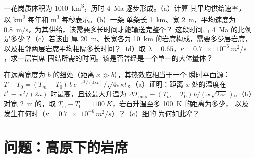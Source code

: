 \begin{exercise}[$\star\star\star$]\label{exo:b2:magma-emplacement:11}
一花岗质体积为 \qty{1000}{km^3}，历时 \qty{4}{Ma} 逐步形成。（a）计算
其平均供给速率，以 \unit{km^3} 每年和 \unit{m^3} 每秒表示。（b）一条
单条长 \qty{1}{km}、宽 \qty{2}{m}，平均速度为
\qty{0.8}{m/s}，为其供给。该需要多长时间才能输送完整个？
这段时间占 \qty{4}{Ma} 的比例是多少？（c）若该由
厚 \qty{20}{m}、长宽各为 \qty{10}{km} 的岩席构成，需要多少层岩席，
以及相邻两层岩席平均相隔多长时间？（d）取
$\lambda = 0.65$，$\kappa = \qty{0.7e-6}{m^2/s}$，求一层岩席
固结所需的时间。该是否曾经是一个单一的大体量体？
\end{exercise}

\begin{exercise}[$\star\star\star$]\label{exo:b2:magma-emplacement:12}
在远离宽度为 $b$ 的细处（距离 $x \gg b$），其热效应相当于一个
瞬时平面源：$T - T_0 = (T_m - T_0)\,b\,e^{-x^2/(4\kappa
t)}/\sqrt{4\pi\kappa t}$。（a）证明：距离 $x$ 处的温度在
$t^* = x^2/(2\kappa)$ 时最高，且该最大升温为 $\Delta T_{\max} = (T_m -
T_0)\,b/(x\sqrt{2\pi e})$。（b）对宽 \qty{2}{m} 的，取 $T_m - T_0 =
\qty{1100}{K}$，岩石升温至多 \qty{100}{K} 的距离为多少，
以及发生在何时（$\kappa = \qty{0.7e-6}{m^2/s}$）？（c）细的
为何如此窄？
\end{exercise}

\section{问题：高原下的岩席}

